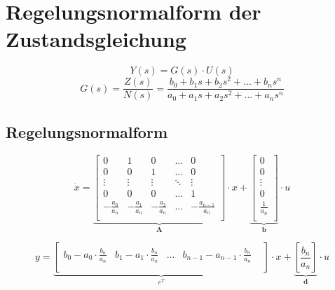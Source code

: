 



\section{Regelungsnormalform der Zustandsgleichung}
\[
	Y(s) = G(s) \cdot U(s)
\]
\[
	G(s)= \frac{Z(s)}{N(s)} = \frac{b_0+b_1s+b_2s^2+...+b_ns^n}{a_0+a_1s+a_2s^2+...+a_ns^n}
\]
\subsection{Regelungsnormalform}
\[
	\dot x=
	\underbrace{
		\begin{bmatrix}
			0 &	1 & 0 & \ldots & 0\\
			0 & 0 & 1 & \ldots & 0\\
			\vdots & \vdots & \vdots & \ddots & \vdots \\
			0 & 0 & 0 & \ldots & 1\\
			-\frac{a_0}{a_n} &-\frac{a_1}{a_n} & -\frac{a_2}{a_n} & \ldots &-\frac{a_{n-1}}{a_n}\\	
		\end{bmatrix}
	}_{\textbf{A}}
	\cdot x +
	\underbrace{
		\begin{bmatrix}
			0 \\
			0 \\
			\vdots \\
			0 \\
			\frac{1}{a_n} \\	
		\end{bmatrix}
	}_{\textbf{b}}
	\cdot u	
\]

\[
	y=
	\underbrace{
			\begin{bmatrix}
				b_0-a_0\cdot\frac{b_n}{a_n} & b_1-a_1\cdot\frac{b_n}{a_n} & \ldots & b_{n-1}-a_{n-1}\cdot\frac{b_n}{a_n} &\\
			\end{bmatrix}
	}_{\textbf{$c^T$}}
	\cdot x  +
	\underbrace{
		\left[ \frac{b_n}{a_n} \right] 
	}_{\textbf{d}}
	\cdot u
\]